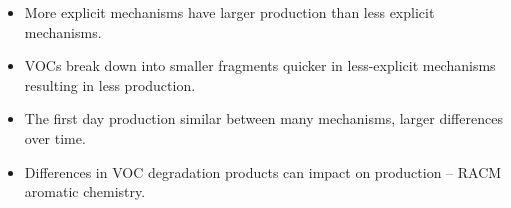 \begin{BlueBox}
    \vskip-1cm
    \begin{block}{}
        \begin{itemize}
            \item More explicit mechanisms have larger  production than less explicit mechanisms. \vspace{10mm}
            \item VOCs break down into smaller fragments quicker in less-explicit mechanisms resulting in less  production. \vspace{10mm} 
            \item The first day  production similar between many mechanisms, larger differences over time. \vspace{10mm}
            \item Differences in VOC degradation products can impact on  production -- RACM aromatic chemistry. \vspace{10mm}
        \end{itemize}        
    \end{block}
\end{BlueBox}
